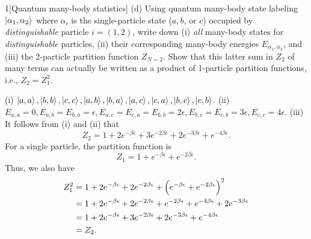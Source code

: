 \documentclass[12pt]{article}
\begin{document}
\begin{problem}{1}[Quantum many-body statistics]
(d) Using quantum many-body state labeling $\ket{\alpha_1,\alpha_2}$ where
$\alpha_i$ is the single-particle state ($a,b$, or $c$) occupied by
\textit{distinguishable} particle $i=(1,2)$, write down (i) \textit{all}
many-body states for \textit{distinguishable} particles, (ii) their
corresponding many-body energies $E_{\alpha_1,\alpha_2}$, and (iii) the
2-particle partition function $Z_{N=2}$. Show that this latter sum in $Z_2$ of
many terms can actually be written as a product of 1-particle partition
functions, i.e., $Z_2=Z_1^2$.
\begin{solution}
(i)
$\ket{a,a},\ket{b,b},\ket{c,c},\ket{a,b},\ket{b,a},\ket{a,c},\ket{c,a},\ket{b,c},\ket{c,b}$.
(ii) $E_{a,a}=0,
E_{a,b}=E_{b,a}=\epsilon,E_{a,c}=E_{c,a}=E_{b,b}=2\epsilon,E_{b,c}=E_{c,b}=3\epsilon,E_{c,c}=4\epsilon$.
(iii) It follows from (i) and (ii) that
\begin{equation}
    Z_2=1+2e^{-\beta\epsilon}+3e^{-2\beta\epsilon}+2e^{-3\beta\epsilon}
    +e^{-4\beta\epsilon}.
\end{equation}
For a single particle, the partition function is
\begin{equation}
    Z_1=1+e^{-\beta\epsilon}+e^{-2\beta\epsilon}. 
\end{equation}
Thus, we also have
\begin{align}
    Z_1^2
    &=1+2e^{-\beta\epsilon}+2e^{-2\beta\epsilon}
    +\qty(e^{-\beta\epsilon}+e^{-2\beta\epsilon})^2\notag\\
    &=1+2e^{-\beta\epsilon}+2e^{-2\beta\epsilon}
    +e^{-2\beta\epsilon}+e^{-4\beta\epsilon}+2e^{-3\beta\epsilon}\notag\\
    &=1+2e^{-\beta\epsilon}
    +3e^{-2\beta\epsilon}
    +2e^{-3\beta\epsilon}
    +e^{-4\beta\epsilon}\notag\\
    &=Z_2.
\end{align}
\end{solution}
\end{problem}
\newpage
\end{document}

